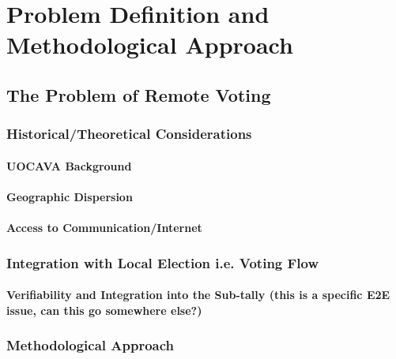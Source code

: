 \chapter{Problem Definition and Methodological Approach}

\section{The Problem of Remote Voting}

\subsection{Historical/Theoretical Considerations}

\subsubsection{UOCAVA Background}
\subsubsection{Geographic Dispersion}
\subsubsection{Access to Communication/Internet}

\subsection{Integration with Local Election i.e. Voting Flow}

\subsubsection{Verifiability and Integration into the Sub-tally (this is a specific E2E issue, can this go somewhere else?)}

\subsection{Methodological Approach}
